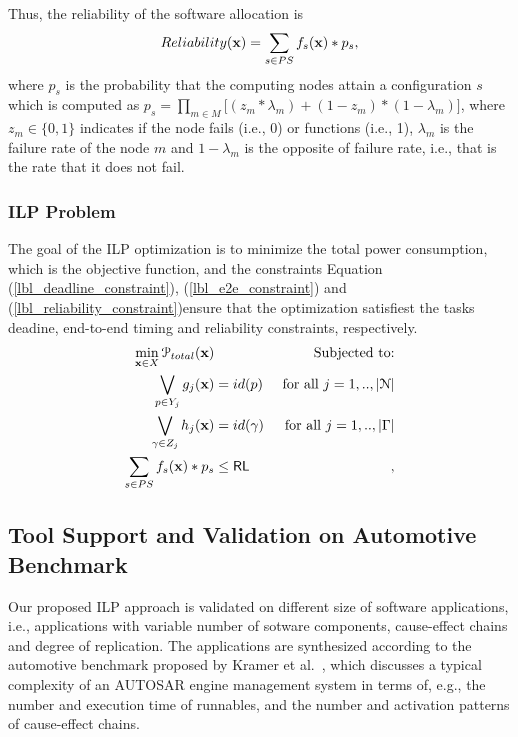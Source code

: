 Thus, the reliability of the software allocation is
\begin{align}
\label{eqn_appreliability_milp}
Reliability(\x)=\sum_{s\in PS}f_s(\x)*p_s,
\end{align}
where $p_s$ is the probability that the computing nodes attain a configuration $s$ which is computed as $p_s=\prod_{m\in M}\big[(z_m*\lambda_m) + (1-z_m)*(1-\lambda_m)\big]$, where $z_m\in\{0,1\}$ indicates if the node fails (i.e., 0) or functions (i.e., 1), $\lambda_m$ is the failure rate of the node $m$ and $1-\lambda_m$ is the opposite of failure rate, i.e., that is the rate that it does not fail.
\subsubsection{ILP Problem}
The goal of the ILP optimization is to minimize the total power consumption, which is the objective function, and the constraints Equation (\ref{lbl_deadline_constraint}), (\ref{lbl_e2e_constraint}) and (\ref{lbl_reliability_constraint})ensure that the optimization satisfiest the tasks deadine, end-to-end timing and reliability constraints, respectively.
\begin{align}
\label{eqn_const_func}
\min_{\x\in X} \mathcal{P}_{total}(\x) && \text{ Subjected to:}\\
\label{lbl_deadline_constraint} 
\bigvee\limits_{p\in Y_j} g_j (\x) &= id(p)& \mbox{ for all } j=1,..,|\mathcal{N}|\\ 
\label{lbl_e2e_constraint}
\bigvee\limits_{\gamma\in Z_j} h_j (\x) &= id(\gamma) & \mbox{ for all } j=1,..,|\Gamma|\\ 
\label{lbl_reliability_constraint}
\sum_{s\in PS}f_s(\x)*p_s &\leq \RL&,
\end{align}

\subsection{Tool Support and Validation on Automotive Benchmark}
Our proposed ILP approach is validated on different size of software applications, i.e., applications with variable number of sotware components, cause-effect chains and degree of replication. The applications are synthesized according to the automotive benchmark proposed by Kramer et al.~\cite{Kramer2015RealFree}, which discusses a typical complexity of an AUTOSAR engine management system in terms of, e.g., the number and execution time of runnables, and the number and activation patterns of cause-effect chains. 


